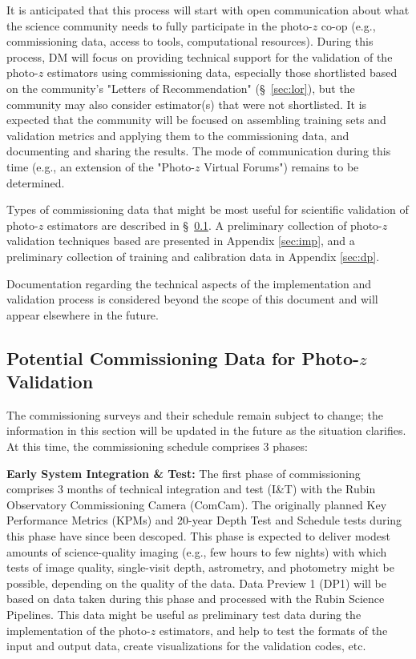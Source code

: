 \documentclass[DM,lsstdraft,toc]{lsstdoc}
\begin{document}
It is anticipated that this process will start with open communication about what the science community needs to fully participate in the photo-$z$ co-op (e.g., commissioning data, access to tools, computational resources).
During this process, DM will focus on providing technical support for the validation of the photo-$z$ estimators using commissioning data, especially those shortlisted based on the community's "Letters of Recommendation" (\S~\ref{sec:lor}), but the community may also consider estimator(s) that were not shortlisted.
It is expected that the community will be focused on assembling training sets and validation metrics and applying them to the commissioning data, and documenting and sharing the results.
The mode of communication during this time (e.g., an extension of the "Photo-$z$ Virtual Forums") remains to be determined.

Types of commissioning data that might be most useful for scientific validation of photo-$z$ estimators are described in \S~\ref{ssec:pzcoop_commissioning}.
A preliminary collection of photo-$z$ validation techniques based are presented in Appendix \ref{sec:imp}, and a preliminary collection of training and calibration data in Appendix \ref{sec:dp}.

Documentation regarding the technical aspects of the implementation and validation process is considered beyond the scope of this document and will appear elsewhere in the future.

\subsection{Potential Commissioning Data for Photo-$z$ Validation}\label{ssec:pzcoop_commissioning}

The commissioning surveys and their schedule remain subject to change; the information in this section will be updated in the future as the situation clarifies.
At this time, the commissioning schedule comprises 3 phases: 

{\bf Early System Integration \& Test:}
The first phase of commissioning comprises 3 months of technical integration and test (I\&T) with the Rubin Observatory Commissioning Camera (ComCam).
The originally planned Key Performance Metrics (KPMs) and 20-year Depth Test and Schedule tests during this phase have since been descoped. 
This phase is expected to deliver modest amounts of science-quality imaging (e.g., few hours to few nights) with which tests of image quality, single-visit depth, astrometry, and photometry might be possible, depending on the quality of the data.  
Data Preview 1 (DP1) will be based on data taken during this phase and processed with the Rubin Science Pipelines. 
This data might be useful as preliminary test data during the implementation of the photo-$z$ estimators, and help to test the formats of the input and output data, create visualizations for the validation codes, etc.
\end{document}
